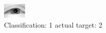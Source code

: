 \begin{figure}[h!]
\begin{center}
\includegraphics[width=0.60\columnwidth]{figures/ID2249_class_1_target_2.png}
\end{center}
\caption{ Classification: 1 actual target: 2}
\label{fig:ID2249_class_1_target_2}
\end{figure}
